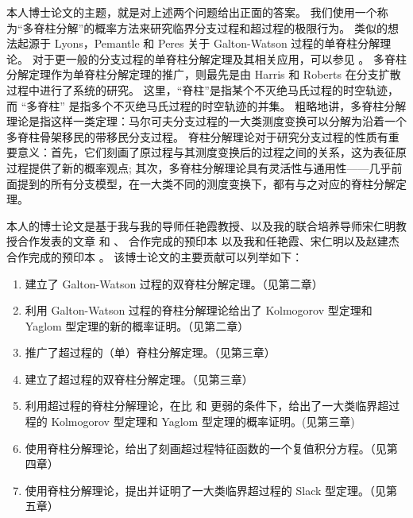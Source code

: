 \documentclass[12pt,a4paper]{amsart}
\numberwithin{equation}{section}
\theoremstyle{plain}
\theoremstyle{definition}
\begin{document}
本人博士论文的主题，就是对上述两个问题给出正面的答案。
我们使用一个称为``多脊柱分解''的概率方法来研究临界分支过程和超过程的极限行为。
类似的想法起源于 Lyons，Pemantle 和 Peres \cite {LyonsPemantlePeres1995Conceptual} 关于 Galton-Watson 过程的单脊柱分解理论。
对于更一般的分支过程的单脊柱分解定理及其相关应用，可以参见
\cite{Aidekon2013Convergence,AidekonShi2014SenetaHeyde,BigginsKyprianou2004Measure,ChauvinRouault1988KPP,Englander2009Law,EnglanderHarrisKyprianou2010Strong,EnglanderKyprianou2004Local,GeorgiiBaake2003Supercritical,HuShi2009Minimal,Lambert2007Quasistationary,LiuRenSong2009Log,RenYang2014Multitype}。
多脊柱分解定理作为单脊柱分解定理的推广，则最先是由 Harris 和 Roberts \cite{HarrisRoberts2017Manytofew} 在分支扩散过程中进行了系统的研究。
这里，``脊柱''是指某个不灭绝马氏过程的时空轨迹，而 ``多脊柱'' 是指多个不灭绝马氏过程的时空轨迹的并集。
粗略地讲，多脊柱分解理论是指这样一类定理：马尔可夫分支过程的一大类测度变换可以分解为沿着一个多脊柱骨架移民的带移民分支过程。
脊柱分解理论对于研究分支过程的性质有重要意义：首先，它们刻画了原过程与其测度变换后的过程之间的关系，这为表征原过程提供了新的概率观点;
其次，多脊柱分解理论具有灵活性与通用性——几乎前面提到的所有分支模型，在一大类不同的测度变换下，都有与之对应的脊柱分解定理。

本人的博士论文是基于我与我的导师任艳霞教授、以及我的联合培养导师宋仁明教授合作发表的文章 \cite{RenSongSun20182spine}和 \cite{RenSongSun2019Spine}、 合作完成的预印本 \cite{RenSongSun2018Limit} 以及我和任艳霞、宋仁明以及赵建杰合作完成的预印本 \cite{RenSongSunZhao2019Stable}。
该博士论文的主要贡献可以列举如下：
\begin{enumerate}
\item
建立了 Galton-Watson 过程的双脊柱分解定理。（见第二章）
\item
利用 Galton-Watson 过程的脊柱分解理论给出了 Kolmogorov 型定理和 Yaglom 型定理的新的概率证明。（见第二章）
\item
推广了超过程的（单）脊柱分解定理。（见第三章）
\item
建立了超过程的双脊柱分解定理。（见第三章）
\item
  利用超过程的脊柱分解理论，在比 \cite{EvansPerkins1990Measurevalued} 和 \cite{RenSongZhang2015Limit} 更弱的条件下，给出了一大类临界超过程的 Kolmogorov 型定理和 Yaglom 型定理的概率证明。(见第三章)
\item
使用脊柱分解理论，给出了刻画超过程特征函数的一个复值积分方程。（见第四章）
\item
使用脊柱分解理论，提出并证明了一大类临界超过程的 Slack 型定理。（见第五章）
\end{enumerate}
\end{document}
